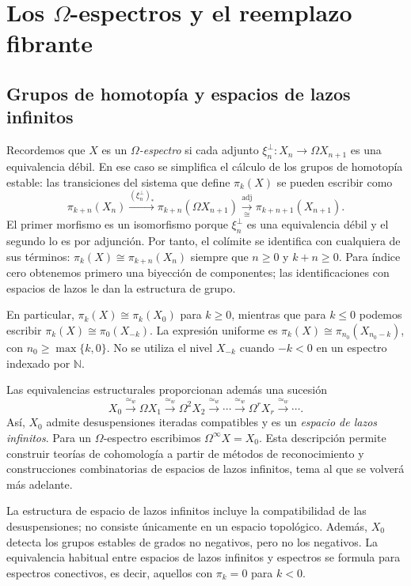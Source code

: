 \section{Los \texorpdfstring{$\Omega$}{Omega}-espectros y el reemplazo fibrante}

\subsection{Grupos de homotopía y espacios de lazos infinitos}

Recordemos que $X$ es un \emph{$\Omega$-espectro} si cada adjunto $\xi_n^{\perp}\colon X_n\to\Omega X_{n+1}$ es una equivalencia débil. En ese caso se simplifica el cálculo de los grupos de homotopía estable: las transiciones del sistema que define $\pi_k(X)$ se pueden escribir como
\[
\pi_{k+n}(X_n)
\xrightarrow{(\xi_n^{\perp})_*}
\pi_{k+n}(\Omega X_{n+1})
\xrightarrow[\cong]{\operatorname{adj}}
\pi_{k+n+1}(X_{n+1}).
\]
El primer morfismo es un isomorfismo porque $\xi_n^{\perp}$ es una equivalencia débil y el segundo lo es por adjunción. Por tanto, el colímite se identifica con cualquiera de sus términos: $\pi_k(X)\cong\pi_{k+n}(X_n)$ siempre que $n\ge0$ y $k+n\ge0$. Para índice cero obtenemos primero una biyección de componentes; las identificaciones con espacios de lazos le dan la estructura de grupo.

En particular, $\pi_k(X)\cong\pi_k(X_0)$ para $k\ge0$, mientras que para $k\le0$ podemos escribir $\pi_k(X)\cong\pi_0(X_{-k})$. La expresión uniforme es $\pi_k(X)\cong\pi_{n_0}(X_{n_0-k})$, con $n_0\ge\max\{k,0\}$. No se utiliza el nivel $X_{-k}$ cuando $-k<0$ en un espectro indexado por $\mathbb N$.

Las equivalencias estructurales proporcionan además una sucesión
\[
X_0\xrightarrow{\simeq_w}\Omega X_1
\xrightarrow{\simeq_w}\Omega^2X_2
\xrightarrow{\simeq_w}\cdots
\xrightarrow{\simeq_w}\Omega^rX_r\xrightarrow{\simeq_w}\cdots.
\]
Así, $X_0$ admite desuspensiones iteradas compatibles y es un \emph{espacio de lazos infinitos}. Para un $\Omega$-espectro escribimos $\Omega^\infty X=X_0$. Esta descripción permite construir teorías de cohomología a partir de métodos de reconocimiento y construcciones combinatorias de espacios de lazos infinitos, tema al que se volverá más adelante.

\begin{nota}
La estructura de espacio de lazos infinitos incluye la compatibilidad de las desuspensiones; no consiste únicamente en un espacio topológico. Además, $X_0$ detecta los grupos estables de grados no negativos, pero no los negativos. La equivalencia habitual entre espacios de lazos infinitos y espectros se formula para espectros conectivos, es decir, aquellos con $\pi_k=0$ para $k<0$.
\end{nota}

